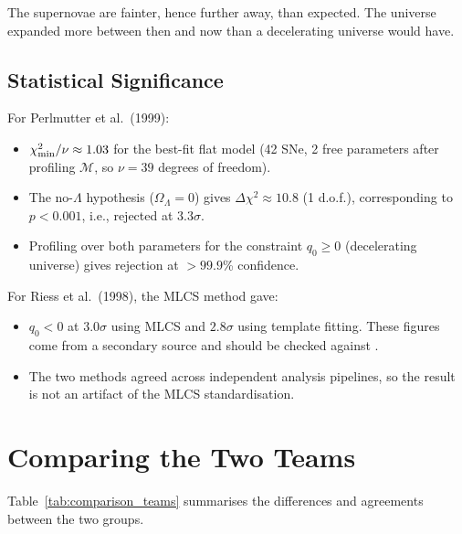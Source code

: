 \documentclass[12pt]{article}
\begin{document}
The supernovae are fainter, hence further away, than expected.  The universe
expanded more between then and now than a decelerating universe would have.

\subsection{Statistical Significance}

For Perlmutter et al.\ (1999):
\begin{itemize}
  \item $\chi^2_{\rm min}/\nu \approx 1.03$ for the best-fit flat
    model (42 SNe, 2 free parameters after profiling $\mathcal{M}$, so
    $\nu = 39$ degrees of freedom).
  \item The no-$\Lambda$ hypothesis ($\Omega_\Lambda = 0$) gives
    $\Delta\chi^2 \approx 10.8$ (1 d.o.f.), corresponding to
    $p < 0.001$, i.e., rejected at $3.3\sigma$.
  \item Profiling over both parameters for the constraint
    $q_0 \geq 0$ (decelerating universe) gives rejection at
    $>99.9$\% confidence.
\end{itemize}
For Riess et al.\ (1998), the MLCS method gave:
\begin{itemize}
  \item $q_0 < 0$ at $3.0\sigma$ using MLCS and $2.8\sigma$ using
    template fitting.  These figures come from a secondary source and should
    be checked against \citet{Riess1998}.
  \item The two methods agreed across independent analysis pipelines, so the
    result is not an artifact of the MLCS standardisation.
\end{itemize}

\section{Comparing the Two Teams}
\label{sec:twogroups}

Table~\ref{tab:comparison_teams} summarises the differences and agreements
between the two groups.
\end{document}
